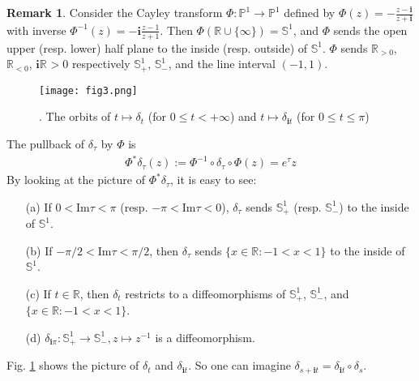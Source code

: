 \documentclass[12pt,b5paper,notitlepage]{article}
\theoremstyle{definition}
\newtheorem{rem}[df]{Remark}
\theoremstyle{plain}
\newcommand{\im}{\mathbf{i}}
\newcommand{\Pbb}{\mathbb P}
\newcommand{\Rbb}{\mathbb R}
\newcommand{\Sbb}{{\mathbb S}}
\newcommand{\Imag}{\mathrm{Im}}
\newcommand{\dps}{\displaystyle}
\numberwithin{equation}{section}
\begin{document}
\begin{rem}\label{lbb15}
Consider the Cayley transform $\Phi:\Pbb^1\rightarrow\Pbb^1$ defined by $\dps\Phi(z)=-\frac{z-\im}{z+\im}$ with inverse $\dps\Phi^{-1}(z)=-\im \frac{z-1}{z+1}$. Then $\Phi(\Rbb\cup\{\infty\})=\Sbb^1$, and $\Phi$ sends the open upper (resp. lower) half plane to the inside (resp. outside) of $\Sbb^1$. $\Phi$ sends $\Rbb_{>0}$, $\Rbb_{<0}$, $\im\Rbb_{}>0$ respectively $\Sbb^1_+$, $\Sbb^1_-$, and the line interval $(-1,1)$.

\begin{figure}[h]
	\centering
	\texttt{[image: fig3.png]}
	\caption{. The  orbits of $t\mapsto\delta_t$ (for $0\leq t<+\infty$) and $t\mapsto\delta_{\im t}$ (for $0\leq t\leq\pi$)}\label{lb101}
\end{figure}

The pullback of $\delta_\tau$ by $\Phi$ is
\begin{align}
\Phi^*\delta_\tau(z):=\Phi^{-1}\circ\delta_\tau\circ \Phi(z)=e^\tau z
\end{align} 
By looking at the picture of $\Phi^*\delta_\tau$, it is easy to see:
\begin{itemize}
\item[(a)] If $0<\Imag \tau<\pi$ (resp. $-\pi<\Imag\tau<0$), $\delta_\tau$ sends $\Sbb^1_+$ (resp. $\Sbb^1_-$) to the inside of $\Sbb^1$.
\item[(b)] If $-\pi/2<\Imag\tau<\pi/2$, then $\delta_\tau$ sends $\{x\in\Rbb:-1<x<1\}$ to the inside of $\Sbb^1$.
\item[(c)] If $t\in\Rbb$, then $\delta_t$ restricts to a diffeomorphisms of $\Sbb^1_+$, $\Sbb^1_-$, and $\{x\in\Rbb:-1<x<1\}$.
\item[(d)] $\delta_{\im\pi}:\Sbb^1_+\rightarrow\Sbb^1_-,z\mapsto z^{-1}$ is a diffeomorphism.
\end{itemize}
Fig. \ref{lb101} shows the picture of $\delta_t$ and $\delta_{\im t}$. So one can imagine $\delta_{s+\im t}=\delta_{\im t}\circ\delta_s$.   \hfill\qedsymbol
\end{rem}





\subsection{}
\end{document}
